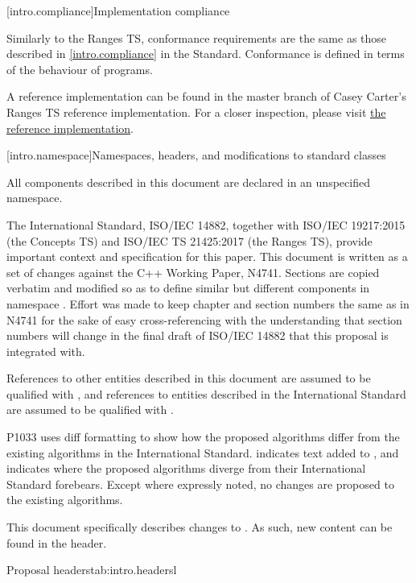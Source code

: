 [intro.compliance]{Implementation compliance}

\pnum
Similarly to the Ranges TS, conformance requirements are the same as those described in
\ref{intro.compliance} in the \Cpp Standard.
\enternote
Conformance is defined in terms of the behaviour of programs.
\exitnote

\pnum
A reference implementation can be found in the master branch of Casey Carter's Ranges TS reference
implementation. For a closer inspection, please visit
\href{https://github.com/CaseyCarter/cmcstl2/tree/master/include/stl2/detail/memory}{the reference implementation}.

[intro.namespace]{Namespaces, headers, and modifications to standard classes}

\pnum
All components described in this document are declared in an unspecified namespace.


\pnum
The International Standard, ISO/IEC 14882, together with ISO/IEC 19217:2015 (the Concepts TS) and
ISO/IEC TS 21425:2017 (the Ranges TS), provide important context and specification for this paper.
This document is written as a set of changes against the C++ Working Paper, N4741. Sections are
copied verbatim and modified so as to define similar but different components in namespace .
Effort was made to keep chapter and section numbers the same as in N4741 for the sake of easy
cross-referencing with the understanding that section numbers will change in the final draft of
ISO/IEC 14882 that this proposal is integrated with.

\pnum
References to other entities described in this document are assumed to be qualified with
, and references to entities described in the International Standard are
assumed to be qualified with .

\pnum
P1033 uses diff formatting to show how the proposed algorithms differ from the existing algorithms
in the International Standard.  indicates text added to
, and  indicates where the proposed algorithms diverge
from their International Standard forebears. Except where expressly noted, no changes are proposed
to the existing algorithms.

\pnum
This document specifically describes changes to . As such, new content can be found
in the  header.

\begin{floattable}{Proposal headers}{tab:intro.headers}{l}
\topline
{}\\
\bottomline
\end{floattable}
